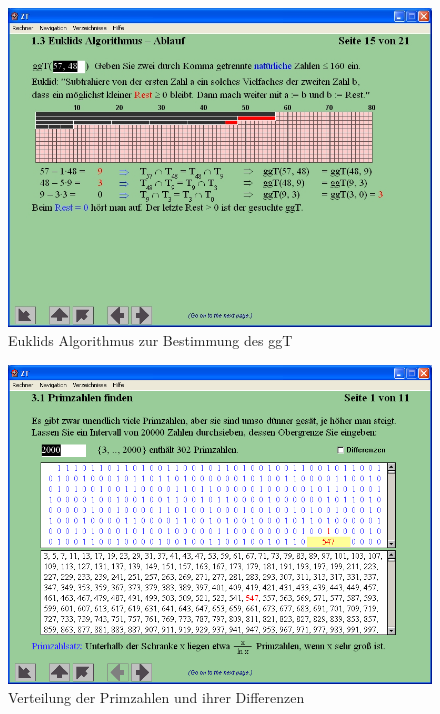 \begin{refsegment}
\begin{figure}[ht]
\begin{center}
\includegraphics[scale=0.4]{figures/NT_Fig_C1-3_EuclidsAlg-Procedure}
\caption{Euklids Algorithmus zur Bestimmung des ggT}
\label{NT_Fig_C1.3_EuclidsAlg-Procedure}
\end{center}
\end{figure}


\begin{figure}[ht]
\begin{center}
\includegraphics[scale=0.4]{figures/NT_Fig_C3-1_PrimesDistribution}
\caption{Verteilung der Primzahlen und ihrer Differenzen}
\label{NT_Fig_C3.1_PrimesDistribution}
\end{center}
\end{figure}



\end{refsegment}
